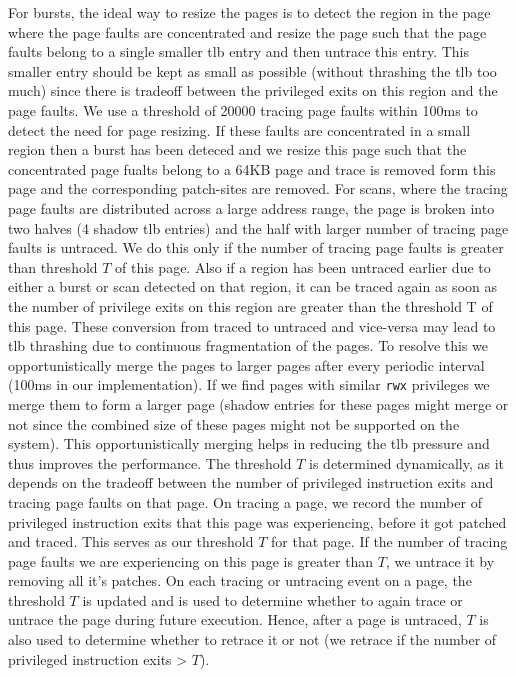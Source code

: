 For bursts, the ideal way to resize the pages is to detect the region in the page where the page faults are concentrated and resize the page such that the page faults belong to a single smaller tlb entry and then untrace this entry. This smaller entry should be kept as small as possible (without thrashing the tlb too much) since there is tradeoff between the privileged exits on this region and the page faults. We use a threshold of 20000 tracing page faults within 100ms to detect the need for page resizing. If these faults are concentrated in a small region then a burst has been deteced and we resize this page such that the concentrated page fualts belong to a 64KB page and trace is removed form this page and the corresponding patch-sites are removed. For scans, where the tracing page faults are distributed across a large address range, the page is broken into two halves (4 shadow tlb entries) and the half with larger number of tracing page faults is untraced. We do this only if the number of tracing page faults is greater than threshold $T$ of this page. 
Also if a region has been untraced earlier due to either a burst or scan detected on that region, it can be traced again as soon as the number of privilege exits on this region are greater than the threshold T of this page. These conversion from traced to untraced and vice-versa may lead to tlb thrashing due to continuous fragmentation of the pages. To resolve this we opportunistically merge the pages to larger pages after every periodic interval (100ms in our implementation). If we find pages with similar {\tt rwx} privileges we merge them to form a larger page (shadow entries for these pages might merge or not since the combined size of these pages might not be supported on the system). This opportunistically merging helps in reducing the tlb pressure and thus improves the performance.
The threshold $T$ is determined dynamically, as it depends on the tradeoff between the number of privileged instruction exits and tracing  page faults on that page. On tracing a page, we record the number of privileged instruction exits that this page was experiencing, before it got patched and traced. This serves as our threshold $T$ for that page. If the number of tracing page faults we are experiencing on this page is greater than $T$, we untrace it by removing all it's patches. On each tracing or untracing event on a page, the threshold $T$ is updated and is used to determine whether to again trace or untrace the page during future execution. Hence, after a page is untraced, $T$ is also used to determine whether to retrace it or not (we retrace if the number of privileged instruction exits > $T$).
